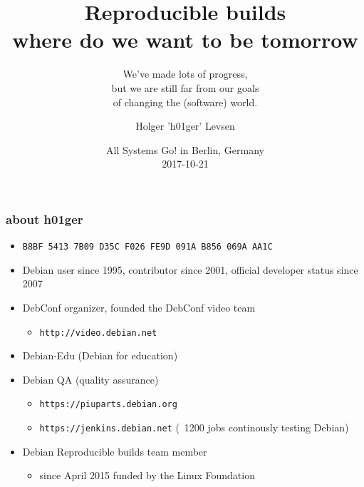 \documentclass[14pt,aspectratio=169]{beamer}
\title[Reproducible Builds tomorrow]{Reproducible
builds \\ where do we want to be tomorrow}
\subtitle{We've made lots of progress, \\
but we are still far from our goals \\
of changing the (software) world.}
\author[h01ger]{%
   \texorpdfstring{
            \centering
            Holger 'h01ger' Levsen
   }{h01ger}}
\date[All Systems Go!]{%
 All Systems Go! in Berlin, Germany\\
 \small{2017-10-21}}
\newif\ifplacelogo
\begin{document}
\placelogofalse

\begin{frame}[plain]
 \titlepage
\end{frame}

\placelogotrue

\begin{frame}
 \frametitle{about h01ger}

 \begin{itemize}
  \item \small{\texttt{B8BF 5413 7B09 D35C F026  FE9D 091A B856 069A AA1C}}
  \item Debian user since 1995, contributor since 2001, official developer
  status since 2007
  \item DebConf organizer,
  founded the DebConf video team
   \begin{itemize}
    \item \texttt{http://video.debian.net}
   \end{itemize}
 \item Debian-Edu (Debian for education)
  \item Debian QA (quality assurance)
  \begin{itemize}
   \item \texttt{https://piuparts.debian.org}
   \item \texttt{https://jenkins.debian.net} (~1200 jobs continously testing Debian)
  \end{itemize}
  \item Debian Reproducible builds team member
  \begin{itemize}
   \item since April 2015 funded by the Linux Foundation
 \end{itemize}
 \end{itemize}
\end{frame}
\end{document}
